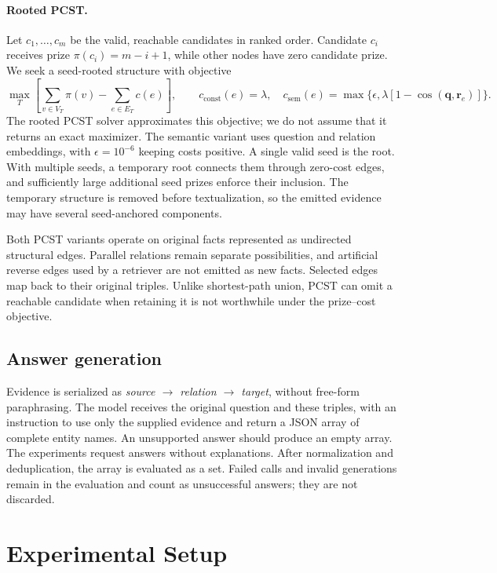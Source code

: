\documentclass[10pt]{article}
\begin{document}
\paragraph{Rooted PCST.}
Let $c_1,\ldots,c_m$ be the valid, reachable candidates in ranked order. Candidate $c_i$ receives prize $\pi(c_i)=m-i+1$, while other nodes have zero candidate prize. We seek a seed-rooted structure with objective
\begin{equation}
 \max_{T}\left[\sum_{v\in V_T}\pi(v)-\sum_{e\in E_T}c(e)\right],
 \qquad
 c_{\mathrm{const}}(e)=\lambda,\quad
 c_{\mathrm{sem}}(e)=\max\{\epsilon,\lambda[1-\cos(\mathbf q,\mathbf r_e)]\}.
 \label{eq:pcst}
\end{equation}
The rooted PCST solver approximates this objective; we do not assume that it returns an exact maximizer. The semantic variant uses question and relation embeddings, with $\epsilon=10^{-6}$ keeping costs positive. A single valid seed is the root. With multiple seeds, a temporary root connects them through zero-cost edges, and sufficiently large additional seed prizes enforce their inclusion. The temporary structure is removed before textualization, so the emitted evidence may have several seed-anchored components.

Both PCST variants operate on original facts represented as undirected structural edges. Parallel relations remain separate possibilities, and artificial reverse edges used by a retriever are not emitted as new facts. Selected edges map back to their original triples. Unlike shortest-path union, PCST can omit a reachable candidate when retaining it is not worthwhile under the prize--cost objective.

\subsection{Answer generation}
\label{sec:generation}

Evidence is serialized as \emph{source $\rightarrow$ relation $\rightarrow$ target}, without free-form paraphrasing. The model receives the original question and these triples, with an instruction to use only the supplied evidence and return a JSON array of complete entity names. An unsupported answer should produce an empty array. The experiments request answers without explanations. After normalization and deduplication, the array is evaluated as a set. Failed calls and invalid generations remain in the evaluation and count as unsuccessful answers; they are not discarded.

\section{Experimental Setup}
\label{sec:setup}
\end{document}
